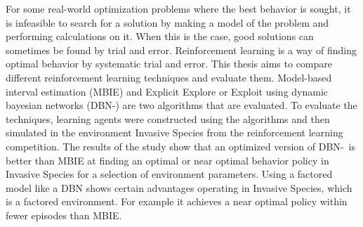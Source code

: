 For some real-world optimization problems where the best behavior is sought, it is infeasible to search for a solution by making a model of the problem and performing calculations on it. When this is the case, good solutions can sometimes be found by trial and error. 
Reinforcement learning is a way of finding optimal behavior by systematic trial and error.
This thesis aims to compare different reinforcement learning techniques and evaluate them. 
Model-based interval estimation (MBIE) and Explicit Explore or Exploit using dynamic bayesian networks (DBN-\etre)
 are two algorithms that are evaluated. 
To evaluate the techniques, learning agents were constructed using the algorithms and 
then simulated in the environment Invasive Species from the reinforcement learning competition.
The results of the study show that an optimized version of DBN-\etre\ is better than MBIE at finding an optimal or near optimal behavior policy in Invasive Species for a selection of environment parameters.
Using a factored model like a DBN shows certain advantages operating in 
Invasive Species, which is a factored environment. For example it achieves a near optimal
policy within fewer episodes than MBIE.






